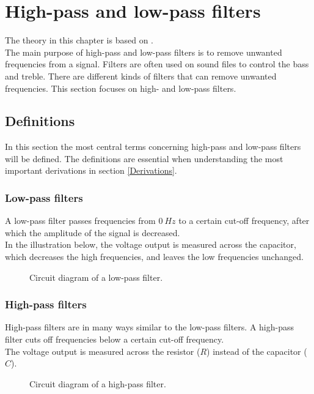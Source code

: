 \chapter{High-pass and low-pass filters} \label{chap:high_low}
The theory in this chapter is based on \cite{bcircuit}\cite{bcircuit5}.\\
The main purpose of high-pass and low-pass filters is to remove unwanted frequencies from a signal. Filters are often used on sound files to control the bass and treble. There are different kinds of filters that can remove unwanted frequencies. This section focuses on high- and low-pass filters.

\section{Definitions}
In this section the most central terms concerning high-pass and low-pass filters will be defined. The definitions are essential when understanding the most important derivations in section \ref{Derivations}.

\subsection{Low-pass filters}
A low-pass filter passes frequencies from  $0~Hz$ to a certain cut-off frequency, after which the amplitude of the signal is decreased.  
\\
In the illustration below, the voltage output is measured across the capacitor, which decreases the high frequencies, and leaves the low frequencies unchanged.
\\
\begin{figure}[H]
	
	\caption{Circuit diagram of a low-pass filter.} \label{lp:diagram}
\end{figure} 
\subsection{High-pass filters}
High-pass filters are in many ways similar to the low-pass filters. A high-pass filter cuts off frequencies below a certain cut-off frequency. \\
The voltage output is measured across the resistor ($R$) instead of the capacitor ($C$). 
\begin{figure}[H]
	
	\caption{Circuit diagram of a high-pass filter.}
	\label{hp:diagram}
\end{figure} 

